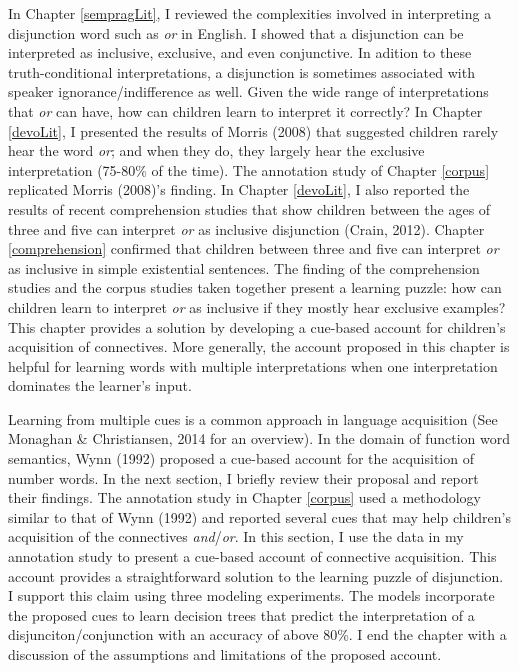 \documentclass[oneside]{report}
\theoremstyle{definition}
\theoremstyle{definition}
\theoremstyle{definition}
\theoremstyle{remark}
\begin{document}
In Chapter \ref{sempragLit}, I reviewed the complexities involved in
interpreting a disjunction word such as \emph{or} in English. I showed
that a disjunction can be interpreted as inclusive, exclusive, and even
conjunctive. In adition to these truth-conditional interpretations, a
disjunction is sometimes associated with speaker ignorance/indifference
as well. Given the wide range of interpretations that \emph{or} can
have, how can children learn to interpret it correctly? In Chapter
\ref{devoLit}, I presented the results of Morris (2008) that suggested
children rarely hear the word \emph{or}; and when they do, they largely
hear the exclusive interpretation (75-80\% of the time). The annotation
study of Chapter \ref{corpus} replicated Morris (2008)'s finding. In
Chapter \ref{devoLit}, I also reported the results of recent
comprehension studies that show children between the ages of three and
five can interpret \emph{or} as inclusive disjunction (Crain, 2012).
Chapter \ref{comprehension} confirmed that children between three and
five can interpret \emph{or} as inclusive in simple existential
sentences. The finding of the comprehension studies and the corpus
studies taken together present a learning puzzle: how can children learn
to interpret \emph{or} as inclusive if they mostly hear exclusive
examples? This chapter provides a solution by developing a cue-based
account for children's acquisition of connectives. More generally, the
account proposed in this chapter is helpful for learning words with
multiple interpretations when one interpretation dominates the learner's
input.

Learning from multiple cues is a common approach in language acquisition
(See Monaghan \& Christiansen, 2014 for an overview). In the domain of
function word semantics, Wynn (1992) proposed a cue-based account for
the acquisition of number words. In the next section, I briefly review
their proposal and report their findings. The annotation study in
Chapter \ref{corpus} used a methodology similar to that of Wynn (1992)
and reported several cues that may help children's acquisition of the
connectives \emph{and}/\emph{or}. In this section, I use the data in my
annotation study to present a cue-based account of connective
acquisition. This account provides a straightforward solution to the
learning puzzle of disjunction. I support this claim using three
modeling experiments. The models incorporate the proposed cues to learn
decision trees that predict the interpretation of a
disjunciton/conjunction with an accuracy of above 80\%. I end the
chapter with a discussion of the assumptions and limitations of the
proposed account.
\end{document}
